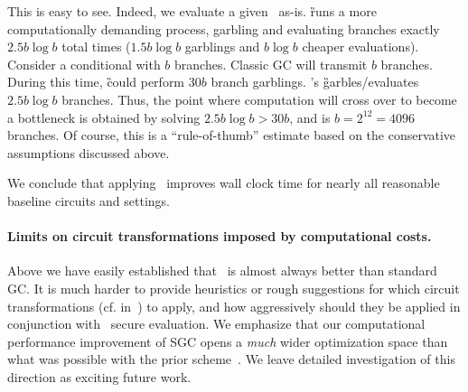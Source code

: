 This is easy to see.  Indeed, we evaluate a given \cir\ as-is.  \G
runs a more computationally demanding  process, garbling and evaluating 
branches exactly $2.5 b \log b$ total times ($1.5 b \log b$ garblings and $ b \log b$ cheaper evaluations).  Consider a
conditional with $b$ branches.  Classic GC will transmit $b$ branches.
During this time, \G could perform $30 b$ branch garblings. 
\ourschemelong's \G garbles/evaluates $2.5 b \log b$ branches.  Thus,  the point where
computation will cross over to become a bottleneck is obtained by solving $2.5b \log b > 30 b$, and is $b= 2^{12} = 4096$
branches.  Of course, this is a ``rule-of-thumb'' estimate based on the conservative assumptions discussed above.

We conclude that applying \ourschemelong\ improves wall clock
time for nearly all reasonable baseline circuits and settings.


\paragraph{Limits on circuit transformations imposed by computational costs.}
Above we have easily  established that \ourschemelong\ is almost always
better than standard GC.   It is much harder to provide heuristics or
rough suggestions for which circuit transformations (cf.
in~) to apply, and how aggressively should
they be applied in conjunction with \ourschemelong\ secure evaluation.  We
emphasize that our computational performance improvement of SGC opens
a {\em much} wider optimization space than what was possible with the
prior scheme~\HK.  We leave detailed investigation of this direction
as exciting future work.





